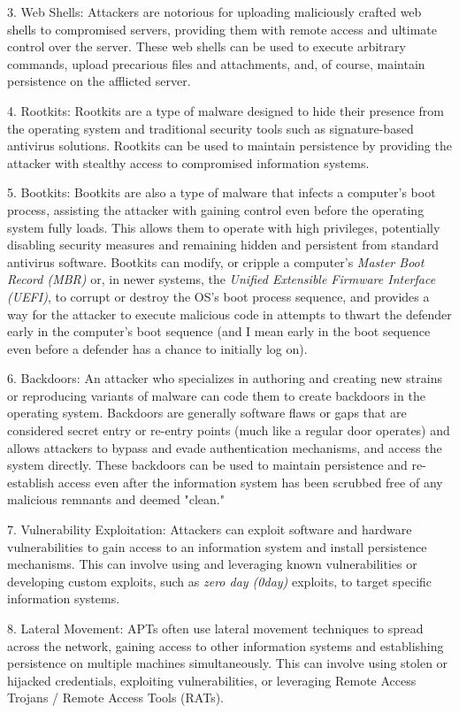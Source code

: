 3. Web Shells: Attackers are notorious for uploading maliciously crafted web shells to compromised servers, providing them with remote access and ultimate control over the server. These web shells can be used to execute arbitrary commands, upload precarious files and attachments, and, of course, maintain persistence on the afflicted server.

4. Rootkits: Rootkits are a type of malware designed to hide their presence from the operating system and traditional security tools such as signature-based antivirus solutions. Rootkits can be used to maintain persistence by providing the attacker with stealthy access to compromised information systems.

5. Bootkits: Bootkits are also a type of malware that infects a computer's boot process, assisting the attacker with gaining control even before the operating system fully loads. This allows them to operate with high privileges, potentially disabling security measures and remaining hidden and persistent from standard antivirus software. Bootkits can modify, or cripple a computer's \textit{Master Boot Record (MBR)} or, in newer systems, the \textit{Unified Extensible Firmware Interface (UEFI)}, to corrupt or destroy the OS's boot process sequence, and provides a way for the attacker to execute malicious code in attempts to thwart the defender early in the computer's boot sequence (and I mean early in the boot sequence even before a defender has a chance to initially log on).

6. Backdoors: An attacker who specializes in authoring and creating new strains or reproducing variants of malware can code them to create backdoors in the operating system. Backdoors are generally software flaws or gaps that are considered secret entry or re-entry points (much like a regular door operates) and allows attackers to bypass and evade authentication mechanisms, and access the system directly. These backdoors can be used to maintain persistence and re-establish access even after the information system has been scrubbed free of any malicious remnants and deemed "clean."

7. Vulnerability Exploitation: Attackers can exploit software and hardware vulnerabilities to gain access to an information system and install persistence mechanisms. This can involve using and leveraging known vulnerabilities or developing custom exploits, such as \textit{zero day (0day)} exploits, to target specific information systems.

8. Lateral Movement: APTs often use lateral movement techniques to spread across the network, gaining access to other information systems and establishing persistence on multiple machines simultaneously. This can involve using stolen or hijacked credentials, exploiting vulnerabilities, or leveraging Remote Access Trojans / Remote Access Tools (RATs).

